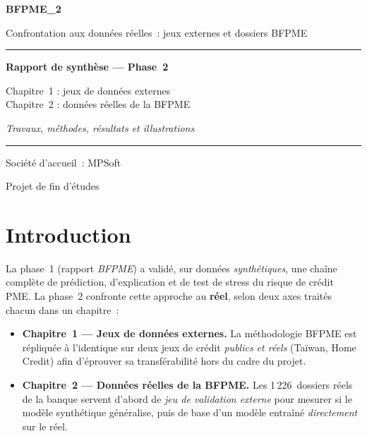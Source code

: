 \documentclass[a4paper,11pt]{report}
\begin{document}
\begin{titlepage}
\centering
\vspace*{2cm}
{\Huge\bfseries\color{BfRed} BFPME\_2\par}
\vspace{0.4cm}
{\Large Confrontation aux données réelles~: jeux externes et dossiers BFPME\par}
\vspace{1.2cm}
\rule{0.8\textwidth}{1.5pt}\par
\vspace{0.8cm}
{\LARGE\bfseries Rapport de synthèse — Phase~2\par}
\vspace{0.3cm}
{\large Chapitre~1 : jeux de données externes\\Chapitre~2 : données réelles de la BFPME\par}
\vspace{0.6cm}
{\large\itshape Travaux, méthodes, résultats et illustrations\par}
\vspace{1cm}
\rule{0.8\textwidth}{1.5pt}\par
\vfill
{\large Société d'accueil~: MPSoft\par}
{\large Projet de fin d'études\par}
\vspace{1cm}
\end{titlepage}

\tableofcontents
\newpage

\chapter*{Introduction}

La phase~1 (rapport \textit{BFPME}) a validé, sur données \emph{synthétiques}, une chaîne
complète de prédiction, d'explication et de test de stress du risque de crédit PME. La phase~2
confronte cette approche au \textbf{réel}, selon deux axes traités chacun dans un chapitre~:

\begin{itemize}
  \item \textbf{Chapitre~1 — Jeux de données externes.} La méthodologie BFPME est répliquée à
        l'identique sur deux jeux de crédit \emph{publics et réels} (Taïwan, Home Credit) afin
        d'éprouver sa transférabilité hors du cadre du projet.
  \item \textbf{Chapitre~2 — Données réelles de la BFPME.} Les 1\,226~dossiers réels de la banque
        servent d'abord de \emph{jeu de validation externe} pour mesurer si le modèle synthétique
        généralise, puis de base d'un modèle entraîné \emph{directement} sur le réel.
\end{itemize}
\end{document}
